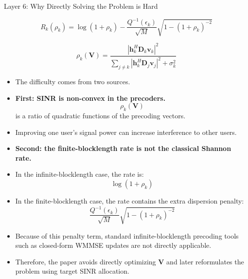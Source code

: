 \documentclass{beamer}
\begin{document}
\begin{frame}{Layer 6: Why Directly Solving the Problem is Hard}
\scriptsize

\[
R_k(\rho_k)
=
\log(1+\rho_k)
-
\frac{Q^{-1}(\epsilon_k)}{\sqrt{M}}
\sqrt{1-(1+\rho_k)^{-2}}
\]

\[
\rho_k(\mathbf{V})
=
\frac{
\left|\mathbf{h}_k^H\mathbf{D}_k\mathbf{v}_k\right|^2
}{
\sum_{j\ne k}
\left|\mathbf{h}_k^H\mathbf{D}_j\mathbf{v}_j\right|^2
+
\sigma_k^2
}
\]

\begin{itemize}
    \item The difficulty comes from two sources.

    \item \textbf{First: SINR is non-convex in the precoders.}
    \[
        \rho_k(\mathbf{V})
    \]
    is a ratio of quadratic functions of the precoding vectors.

    \item Improving one user's signal power can increase interference to other users.

    \item \textbf{Second: the finite-blocklength rate is not the classical Shannon rate.}

    \item In the infinite-blocklength case, the rate is:
    \[
        \log(1+\rho_k)
    \]

    \item In the finite-blocklength case, the rate contains the extra dispersion penalty:
    \[
        \frac{Q^{-1}(\epsilon_k)}{\sqrt{M}}
        \sqrt{1-(1+\rho_k)^{-2}}
    \]

    \item Because of this penalty term, standard infinite-blocklength precoding tools such as closed-form WMMSE updates are not directly applicable.

    \item Therefore, the paper avoids directly optimizing \(\mathbf{V}\) and later reformulates the problem using target SINR allocation.
\end{itemize}

\end{frame}
\end{document}
